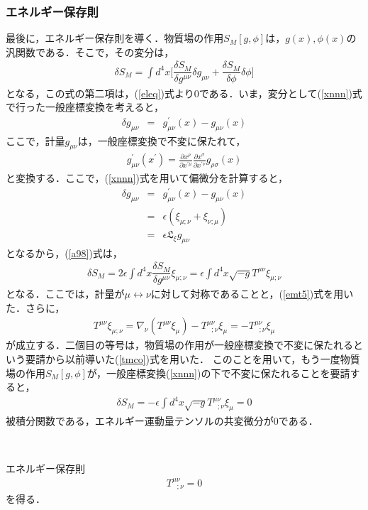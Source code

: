 \subsubsection{エネルギー保存則}
最後に，エネルギー保存則を導く．物質場の作用$S_{M}[g,\phi]$は，$g(x),\phi(x)$の汎関数である．そこで，その変分は，
\begin{eqnarray}
\label{a98}
\delta S_{M}=\int d^4x\biggl[\dfrac{\delta S_{M}}{\delta g^{\mu\nu}}\delta g_{\mu\nu}+\dfrac{\delta S_{M}}{\delta \phi}\delta \phi\biggr]
\end{eqnarray}
となる，この式の第二項は，(\ref{eleq})式より$0$である．いま，変分として(\ref{xnnn})式で行った一般座標変換を考えると，
\begin{eqnarray}
\delta g_{\mu\nu}&=&g^{\prime}_{\mu\nu}(x)-g_{\mu\nu}(x)
\end{eqnarray}
ここで，計量$g_{\mu\nu}$は，一般座標変換で不変に保たれて，
\begin{eqnarray}
g^{\prime}_{\mu\nu}(x^{\prime})=\frac{\partial x^{\rho}}{\partial x^{\prime \mu}}\frac{\partial x^{\sigma}}{\partial x^{\prime \nu}}g_{\rho\sigma}(x)
\end{eqnarray}
と変換する．ここで，(\ref{xnnn})式を用いて偏微分を計算すると，
\begin{eqnarray}
\label{a102}
\delta g_{\mu\nu}&=&g^{\prime}_{\mu\nu}(x)-g_{\mu\nu}(x) \nonumber \\
&=&\epsilon(\xi_{\mu;\nu}+\xi_{\nu;\mu})\nonumber \\
&=&\epsilon \mathfrak{L}_{\xi}g_{\mu\nu}
\end{eqnarray}
となるから，(\ref{a98})式は，
\begin{eqnarray}
\delta S_{M}=2\epsilon \int d^4x \dfrac{\delta S_{M}}{\delta g^{\mu\nu}}\xi_{\mu;\nu}=\epsilon \int d^4x \sqrt{-g}T^{\mu\nu}\xi_{\mu;\nu}
\end{eqnarray}
となる．ここでは，計量が$\mu\leftrightarrow\nu$に対して対称であることと，(\ref{emt5})式を用いた．さらに，
\begin{eqnarray}
T^{\mu\nu}\xi_{\mu;\nu}=\nabla_{\nu}(T^{\mu\nu}\xi_{\mu})-T^{\mu\nu}_{ \ \ \ ;\nu}\xi_{\mu}=-T^{\mu\nu}_{ \ \ \ ;\nu}\xi_{\mu}
\end{eqnarray}
が成立する．二個目の等号は，物質場の作用が一般座標変換で不変に保たれるという要請から以前導いた(\ref{tmco})式を用いた．
このことを用いて，もう一度物質場の作用$S_{M}[g,\phi]$が，一般座標変換(\ref{xnnn})の下で不変に保たれることを要請すると，
\begin{eqnarray}
\delta S_{M}=-\epsilon \int d^4x \sqrt{-g}T^{\mu\nu}_{\ \ \ ;\nu}\xi_{\mu}=0
\end{eqnarray}
被積分関数である，エネルギー運動量テンソルの共変微分が0である．
\begin{empheqboxed}
\

エネルギー保存則
\begin{eqnarray}
\label{eee1}
T^{\mu\nu}_{\ \ \ ;\nu}=0
\end{eqnarray}
を得る．
\end{empheqboxed}
